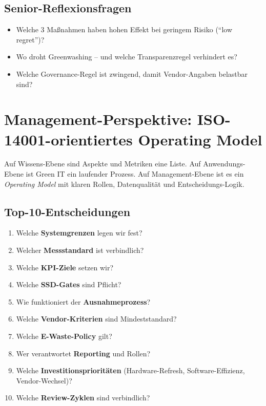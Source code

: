 \documentclass[11pt,a4paper,oneside]{article}
\begin{document}
\subsection{Senior-Reflexionsfragen}

\begin{itemize}
  \item Welche 3 Maßnahmen haben hohen Effekt bei geringem Risiko (``low regret'')?
  \item Wo droht Greenwashing -- und welche Transparenzregel verhindert es?
  \item Welche Governance-Regel ist zwingend, damit Vendor-Angaben belastbar sind?
\end{itemize}

\section{Management-Perspektive: ISO-14001-orientiertes Operating Model}

Auf Wissens-Ebene sind Aspekte und Metriken eine Liste. Auf Anwendungs-Ebene ist Green IT ein laufender Prozess. Auf Management-Ebene ist es ein \emph{Operating Model} mit klaren Rollen, Datenqualität und Entscheidungs-Logik.

\subsection{Top-10-Entscheidungen}

\begin{enumerate}
  \item Welche \textbf{Systemgrenzen} legen wir fest?
  \item Welcher \textbf{Messstandard} ist verbindlich?
  \item Welche \textbf{KPI-Ziele} setzen wir?
  \item Welche \textbf{SSD-Gates} sind Pflicht?
  \item Wie funktioniert der \textbf{Ausnahmeprozess}?
  \item Welche \textbf{Vendor-Kriterien} sind Mindeststandard?
  \item Welche \textbf{E-Waste-Policy} gilt?
  \item Wer verantwortet \textbf{Reporting} und Rollen?
  \item Welche \textbf{Investitionsprioritäten} (Hardware-Refresh, Software-Effizienz, Vendor-Wechsel)?
  \item Welche \textbf{Review-Zyklen} sind verbindlich?
\end{enumerate}
\end{document}
